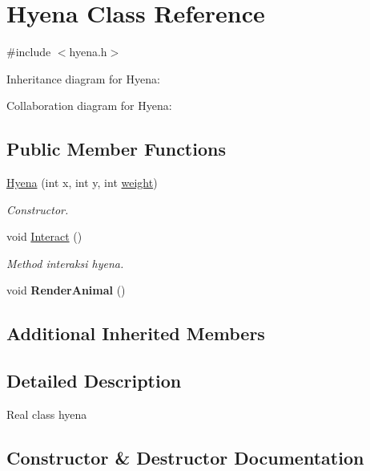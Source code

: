 \hypertarget{classHyena}{}\section{Hyena Class Reference}
\label{classHyena}


{\ttfamily \#include $<$hyena.\+h$>$}



Inheritance diagram for Hyena\+:


Collaboration diagram for Hyena\+:
\subsection*{Public Member Functions}
\begin{DoxyCompactItemize}
\item 
\hyperlink{classHyena_a342b099c741d96fdc0fd728cd53922f2}{Hyena} (int x, int y, int \hyperlink{classAnimal_a9a3b22f243f7109c57f36b3c660feb6e}{weight})
\begin{DoxyCompactList}\small\item\em Constructor. \end{DoxyCompactList}\item 
void \hyperlink{classHyena_abc079aa772715b60643dd3fa2b78ac5c}{Interact} ()\hypertarget{classHyena_abc079aa772715b60643dd3fa2b78ac5c}{}\label{classHyena_abc079aa772715b60643dd3fa2b78ac5c}

\begin{DoxyCompactList}\small\item\em Method interaksi hyena. \end{DoxyCompactList}\item 
void {\bfseries Render\+Animal} ()\hypertarget{classHyena_a7bcc29185a49f23d35a38c7ef94b242d}{}\label{classHyena_a7bcc29185a49f23d35a38c7ef94b242d}

\end{DoxyCompactItemize}
\subsection*{Additional Inherited Members}


\subsection{Detailed Description}
Real class hyena 

\subsection{Constructor \& Destructor Documentation}
